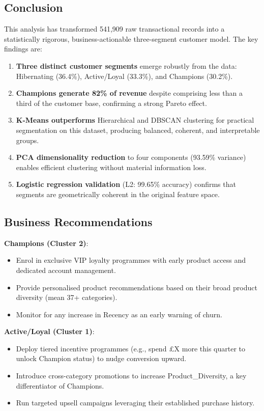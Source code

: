 \documentclass[10pt,a4paper]{article}
\begin{document}
\subsection{Conclusion}

This analysis has transformed 541,909 raw transactional records into a statistically
rigorous, business-actionable three-segment customer model.  The key findings are:

\begin{enumerate}[leftmargin=*]
  \item \textbf{Three distinct customer segments} emerge robustly from the data:
        Hibernating (36.4\%), Active/Loyal (33.3\%), and Champions (30.2\%).
  \item \textbf{Champions generate 82\% of revenue} despite comprising less than a
        third of the customer base, confirming a strong Pareto effect.
  \item \textbf{K-Means outperforms} Hierarchical and DBSCAN clustering for practical
        segmentation on this dataset, producing balanced, coherent, and interpretable groups.
  \item \textbf{PCA dimensionality reduction} to four components (93.59\% variance)
        enables efficient clustering without material information loss.
  \item \textbf{Logistic regression validation} (L2: 99.65\% accuracy) confirms that
        segments are geometrically coherent in the original feature space.
\end{enumerate}

\subsection{Business Recommendations}

\textbf{Champions (Cluster 2)}:
\begin{itemize}[leftmargin=*,noitemsep]
  \item Enrol in exclusive VIP loyalty programmes with early product access and
        dedicated account management.
  \item Provide personalised product recommendations based on their broad product
        diversity (mean 37+ categories).
  \item Monitor for any increase in Recency as an early warning of churn.
\end{itemize}

\textbf{Active/Loyal (Cluster 1)}:
\begin{itemize}[leftmargin=*,noitemsep]
  \item Deploy tiered incentive programmes (e.g., spend \pounds X more this quarter
        to unlock Champion status) to nudge conversion upward.
  \item Introduce cross-category promotions to increase Product\_Diversity, a key
        differentiator of Champions.
  \item Run targeted upsell campaigns leveraging their established purchase history.
\end{itemize}
\end{document}

